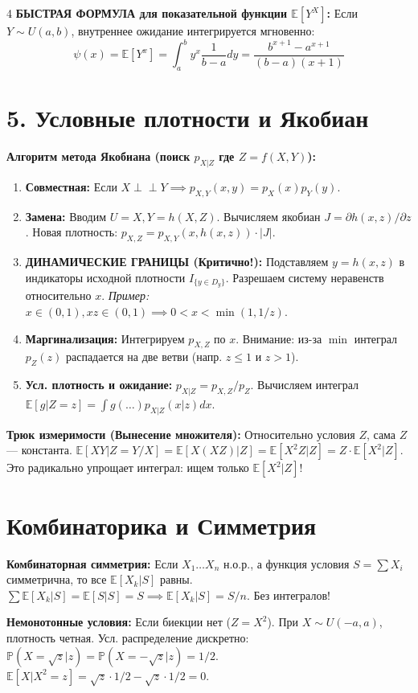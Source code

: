 \documentclass[8pt, a4paper, landscape]{extarticle}
\newcommand{\E}{\mathbb{E}}
\renewcommand{\P}{\mathbb{P}}
\begin{document}
\begin{multicols*}{4}
\textbf{БЫСТРАЯ ФОРМУЛА для показательной функции $\E[Y^X]$:}
Если $Y \sim U(a,b)$, внутреннее ожидание интегрируется мгновенно:
$$ \psi(x) = \E[Y^x] = \int_a^b y^x \frac{1}{b-a} dy = \frac{b^{x+1}-a^{x+1}}{(b-a)(x+1)} $$

\section*{5. Условные плотности и Якобиан}
\textbf{Алгоритм метода Якобиана (поиск $p_{X|Z}$ где $Z=f(X,Y)$):}
\begin{enumerate}
    \item \textbf{Совместная:} Если $X \perp\!\!\perp Y \implies p_{X,Y}(x,y) = p_X(x)p_Y(y)$.
    \item \textbf{Замена:} Вводим $U=X, Y=h(X,Z)$. Вычисляем якобиан $J = \partial h(x,z) / \partial z$. Новая плотность: $p_{X,Z} = p_{X,Y}(x, h(x,z)) \cdot |J|$.
    \item \textbf{ДИНАМИЧЕСКИЕ ГРАНИЦЫ (Критично!):} Подставляем $y=h(x,z)$ в индикаторы исходной плотности $I_{\{y \in D_y\}}$. Разрешаем систему неравенств относительно $x$.
    \textit{Пример:} $x \in (0,1), xz \in (0,1) \implies 0 < x < \min(1, 1/z)$.
    \item \textbf{Маргинализация:} Интегрируем $p_{X,Z}$ по $x$. Внимание: из-за $\min$ интеграл $p_Z(z)$ распадается на две ветви (напр. $z \le 1$ и $z > 1$).
    \item \textbf{Усл. плотность и ожидание:} $p_{X|Z} = p_{X,Z}/p_Z$. Вычисляем интеграл $\E[g|Z=z] = \int g(\dots) p_{X|Z}(x|z)dx$.
\end{enumerate}

\textbf{Трюк измеримости (Вынесение множителя):}
Относительно условия $Z$, сама $Z$ — константа.
$\E[XY | Z=Y/X] = \E[X(XZ)|Z] = \E[X^2 Z|Z] = Z \cdot \E[X^2|Z]$.
Это радикально упрощает интеграл: ищем только $\E[X^2|Z]$!

\section*{Комбинаторика и Симметрия}
\textbf{Комбинаторная симметрия:} Если $X_1 \dots X_n$ н.о.р., а функция условия $S = \sum X_i$ симметрична, то все $\E[X_k|S]$ равны.
$\sum \E[X_k|S] = \E[S|S] = S \implies \E[X_k|S] = S/n$. Без интегралов!

\textbf{Немонотонные условия:} Если биекции нет ($Z=X^2$).
При $X \sim U(-a,a)$, плотность четная. Усл. распределение дискретно: $\P(X=\sqrt{z}|z) = \P(X=-\sqrt{z}|z) = 1/2$.
$\E[X|X^2=z] = \sqrt{z}\cdot 1/2 - \sqrt{z}\cdot 1/2 = 0$.



\end{multicols*}
\end{document}
